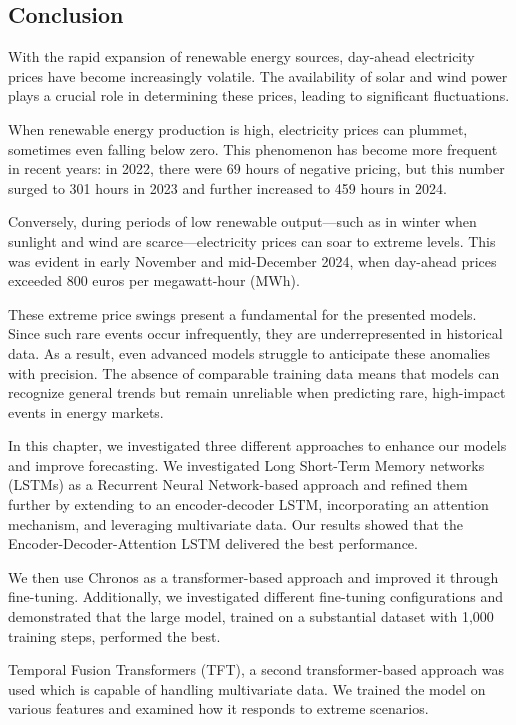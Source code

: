 \documentclass[a4paper]{article}
\begin{document}
    

    \subsection{Conclusion}\label{conclusion}

    With the rapid expansion of renewable energy sources, day-ahead
electricity prices have become increasingly volatile. The availability
of solar and wind power plays a crucial role in determining these
prices, leading to significant fluctuations.

When renewable energy production is high, electricity prices can
plummet, sometimes even falling below zero. This phenomenon has become
more frequent in recent years: in 2022, there were 69 hours of negative
pricing, but this number surged to 301 hours in 2023 and further
increased to 459 hours in 2024.

Conversely, during periods of low renewable output---such as in winter
when sunlight and wind are scarce---electricity prices can soar to
extreme levels. This was evident in early November and mid-December
2024, when day-ahead prices exceeded 800 euros per megawatt-hour (MWh).

These extreme price swings present a fundamental for the presented
models. Since such rare events occur infrequently, they are
underrepresented in historical data. As a result, even advanced models
struggle to anticipate these anomalies with precision. The absence of
comparable training data means that models can recognize general trends
but remain unreliable when predicting rare, high-impact events in energy
markets.

    In this chapter, we investigated three different approaches to enhance
our models and improve forecasting. We investigated Long Short-Term
Memory networks (LSTMs) as a Recurrent Neural Network-based approach and
refined them further by extending to an encoder-decoder LSTM,
incorporating an attention mechanism, and leveraging multivariate data.
Our results showed that the Encoder-Decoder-Attention LSTM delivered the
best performance.

We then use Chronos as a transformer-based approach and improved it
through fine-tuning. Additionally, we investigated different fine-tuning
configurations and demonstrated that the large model, trained on a
substantial dataset with 1,000 training steps, performed the best.

Temporal Fusion Transformers (TFT), a second transformer-based approach
was used which is capable of handling multivariate data. We trained the
model on various features and examined how it responds to extreme
scenarios.
\end{document}
